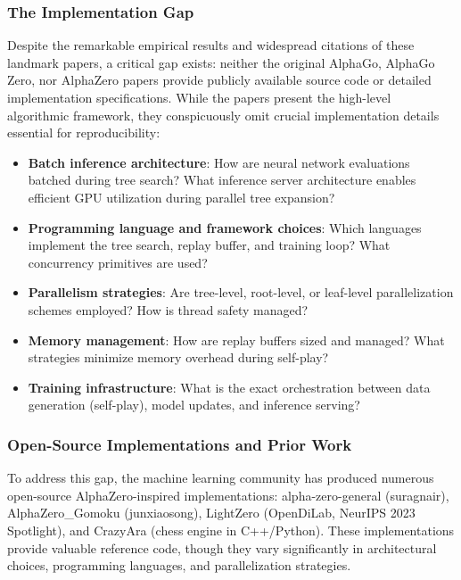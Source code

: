 \documentclass[12pt]{article}
\begin{document}
\subsubsection{The Implementation Gap}

Despite the remarkable empirical results and widespread citations of these landmark papers, a critical gap exists: neither the original AlphaGo, AlphaGo Zero, nor AlphaZero papers provide publicly available source code or detailed implementation specifications. While the papers present the high-level algorithmic framework, they conspicuously omit crucial implementation details essential for reproducibility:

\begin{itemize}
    \item \textbf{Batch inference architecture}: How are neural network evaluations batched during tree search? What inference server architecture enables efficient GPU utilization during parallel tree expansion?
    \item \textbf{Programming language and framework choices}: Which languages implement the tree search, replay buffer, and training loop? What concurrency primitives are used?
    \item \textbf{Parallelism strategies}: Are tree-level, root-level, or leaf-level parallelization schemes employed? How is thread safety managed?
    \item \textbf{Memory management}: How are replay buffers sized and managed? What strategies minimize memory overhead during self-play?
    \item \textbf{Training infrastructure}: What is the exact orchestration between data generation (self-play), model updates, and inference serving?
\end{itemize}

\subsubsection{Open-Source Implementations and Prior Work}

To address this gap, the machine learning community has produced numerous open-source AlphaZero-inspired implementations: alpha-zero-general (suragnair), AlphaZero\_Gomoku (junxiaosong), LightZero (OpenDiLab, NeurIPS 2023 Spotlight), and CrazyAra (chess engine in C++/Python). These implementations provide valuable reference code, though they vary significantly in architectural choices, programming languages, and parallelization strategies.
\end{document}
